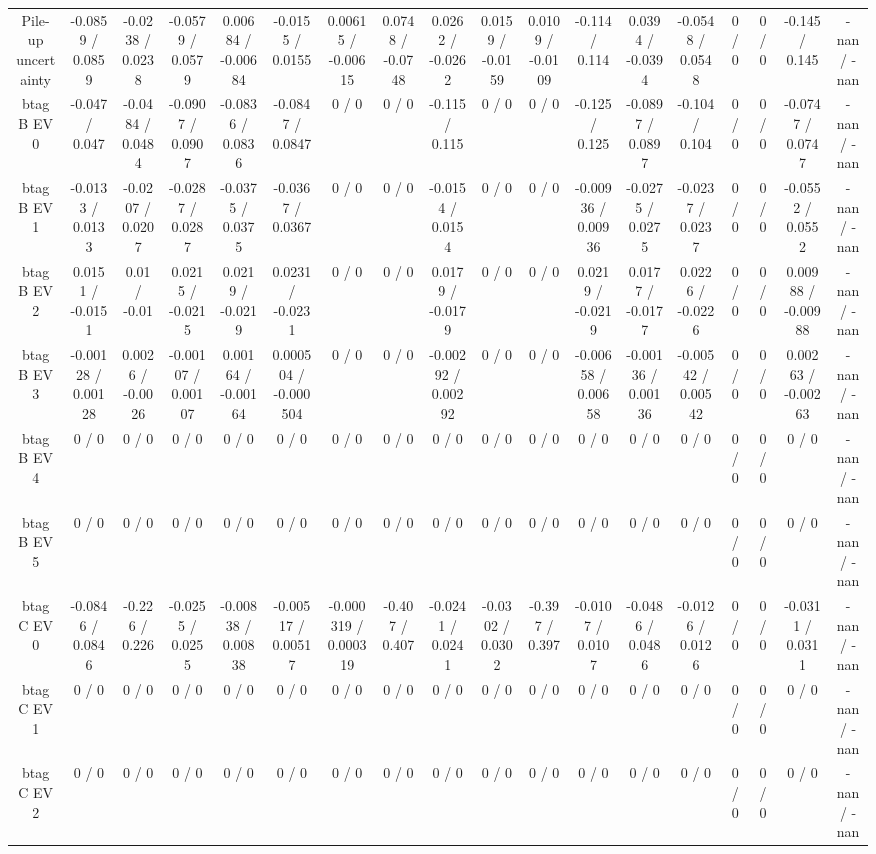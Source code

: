 \documentclass[10pt]{article}
\begin{document}
\begin{table}[htbp]
\begin{center}
\begin{tabular}{|c|c|c|c|c|c|c|c|c|c|c|c|c|c|c|c|c|c|}
  Pile-up uncertainty & -0.0859 / 0.0859 & -0.0238 / 0.0238 & -0.0579 / 0.0579 & 0.00684 / -0.00684 & -0.0155 / 0.0155 & 0.00615 / -0.00615 & 0.0748 / -0.0748 & 0.0262 / -0.0262 & 0.0159 / -0.0159 & 0.0109 / -0.0109 & -0.114 / 0.114 & 0.0394 / -0.0394 & -0.0548 / 0.0548 & 0 / 0 & 0 / 0 & -0.145 / 0.145 & -nan / -nan \\ 
  btag B EV 0 & -0.047 / 0.047 & -0.0484 / 0.0484 & -0.0907 / 0.0907 & -0.0836 / 0.0836 & -0.0847 / 0.0847 & 0 / 0 & 0 / 0 & -0.115 / 0.115 & 0 / 0 & 0 / 0 & -0.125 / 0.125 & -0.0897 / 0.0897 & -0.104 / 0.104 & 0 / 0 & 0 / 0 & -0.0747 / 0.0747 & -nan / -nan \\ 
  btag B EV 1 & -0.0133 / 0.0133 & -0.0207 / 0.0207 & -0.0287 / 0.0287 & -0.0375 / 0.0375 & -0.0367 / 0.0367 & 0 / 0 & 0 / 0 & -0.0154 / 0.0154 & 0 / 0 & 0 / 0 & -0.00936 / 0.00936 & -0.0275 / 0.0275 & -0.0237 / 0.0237 & 0 / 0 & 0 / 0 & -0.0552 / 0.0552 & -nan / -nan \\ 
  btag B EV 2 & 0.0151 / -0.0151 & 0.01 / -0.01 & 0.0215 / -0.0215 & 0.0219 / -0.0219 & 0.0231 / -0.0231 & 0 / 0 & 0 / 0 & 0.0179 / -0.0179 & 0 / 0 & 0 / 0 & 0.0219 / -0.0219 & 0.0177 / -0.0177 & 0.0226 / -0.0226 & 0 / 0 & 0 / 0 & 0.00988 / -0.00988 & -nan / -nan \\ 
  btag B EV 3 & -0.00128 / 0.00128 & 0.0026 / -0.0026 & -0.00107 / 0.00107 & 0.00164 / -0.00164 & 0.000504 / -0.000504 & 0 / 0 & 0 / 0 & -0.00292 / 0.00292 & 0 / 0 & 0 / 0 & -0.00658 / 0.00658 & -0.00136 / 0.00136 & -0.00542 / 0.00542 & 0 / 0 & 0 / 0 & 0.00263 / -0.00263 & -nan / -nan \\ 
  btag B EV 4 & 0 / 0 & 0 / 0 & 0 / 0 & 0 / 0 & 0 / 0 & 0 / 0 & 0 / 0 & 0 / 0 & 0 / 0 & 0 / 0 & 0 / 0 & 0 / 0 & 0 / 0 & 0 / 0 & 0 / 0 & 0 / 0 & -nan / -nan \\ 
  btag B EV 5 & 0 / 0 & 0 / 0 & 0 / 0 & 0 / 0 & 0 / 0 & 0 / 0 & 0 / 0 & 0 / 0 & 0 / 0 & 0 / 0 & 0 / 0 & 0 / 0 & 0 / 0 & 0 / 0 & 0 / 0 & 0 / 0 & -nan / -nan \\ 
  btag C EV 0 & -0.0846 / 0.0846 & -0.226 / 0.226 & -0.0255 / 0.0255 & -0.00838 / 0.00838 & -0.00517 / 0.00517 & -0.000319 / 0.000319 & -0.407 / 0.407 & -0.0241 / 0.0241 & -0.0302 / 0.0302 & -0.397 / 0.397 & -0.0107 / 0.0107 & -0.0486 / 0.0486 & -0.0126 / 0.0126 & 0 / 0 & 0 / 0 & -0.0311 / 0.0311 & -nan / -nan \\ 
  btag C EV 1 & 0 / 0 & 0 / 0 & 0 / 0 & 0 / 0 & 0 / 0 & 0 / 0 & 0 / 0 & 0 / 0 & 0 / 0 & 0 / 0 & 0 / 0 & 0 / 0 & 0 / 0 & 0 / 0 & 0 / 0 & 0 / 0 & -nan / -nan \\ 
  btag C EV 2 & 0 / 0 & 0 / 0 & 0 / 0 & 0 / 0 & 0 / 0 & 0 / 0 & 0 / 0 & 0 / 0 & 0 / 0 & 0 / 0 & 0 / 0 & 0 / 0 & 0 / 0 & 0 / 0 & 0 / 0 & 0 / 0 & -nan / -nan \\ 

\end{tabular}
\end{center}
\end{table}
\end{document}
